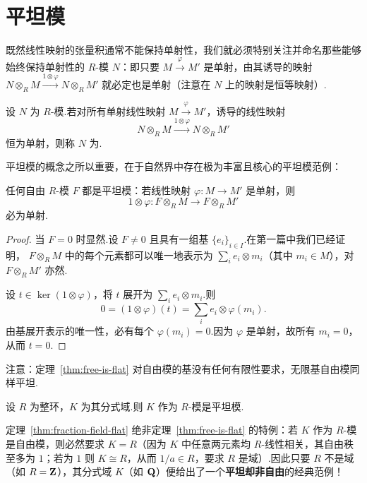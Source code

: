 \section{平坦模}
\label{sec:flat}

既然线性映射的张量积通常不能保持单射性，我们就必须特别关注并命名那些能够始终保持单射性的 $R$-模 $N$：即只要 $M \xrightarrow{\varphi} M'$ 是单射，由其诱导的映射 $N \otimes_R M \xrightarrow{1 \otimes \varphi} N \otimes_R M'$ 就必定也是单射（注意在 $N$ 上的映射是恒等映射）.

\begin{definition}\label{def:flat-module}
设 $N$ 为 $R$-模.若对所有单射线性映射 $M \xrightarrow{\varphi} M'$，诱导的线性映射
\[
  N \otimes_R M \xrightarrow{1 \otimes \varphi} N \otimes_R M'
\]
恒为单射，则称 $N$ 为.
\end{definition}

平坦模的概念之所以重要，在于自然界中存在极为丰富且核心的平坦模范例：

\begin{theorem}[自由模必平坦]\label{thm:free-is-flat}
任何自由 $R$-模 $F$ 都是平坦模：若线性映射 $\varphi \colon M \to M'$ 是单射，则
\[
  1 \otimes \varphi \colon F \otimes_R M \to F \otimes_R M'
\]
必为单射.
\end{theorem}

\begin{proof}
当 $F = 0$ 时显然.设 $F \neq 0$ 且具有一组基 $\{e_i\}_{i \in I}$.在第一篇中我们已经证明， $F \otimes_R M$ 中的每个元素都可以唯一地表示为 $\sum_{i} e_i \otimes m_i$（其中 $m_i \in M$），对 $F \otimes_R M'$ 亦然.

设 $t \in \ker(1 \otimes \varphi)$，将 $t$ 展开为 $\sum_i e_i \otimes m_i$.则
\[
  0 = (1 \otimes \varphi)(t) = \sum_{i} e_i \otimes \varphi(m_i).
\]
由基展开表示的唯一性，必有每个 $\varphi(m_i) = 0$.因为 $\varphi$ 是单射，故所有 $m_i = 0$，从而 $t = 0$.
\end{proof}

注意：定理~\ref{thm:free-is-flat} 对自由模的基没有任何有限性要求，无限基自由模同样平坦.

\begin{theorem}[分式域必平坦]\label{thm:fraction-field-flat}
设 $R$ 为整环，$K$ 为其分式域.则 $K$ 作为 $R$-模是平坦模.
\end{theorem}

\begin{remark}\label{rem:fraction-not-free}
定理~\ref{thm:fraction-field-flat} 绝非定理~\ref{thm:free-is-flat} 的特例：若 $K$ 作为 $R$-模是自由模，则必然要求 $K = R$（因为 $K$ 中任意两元素均 $R$-线性相关，其自由秩至多为 $1$；若为 $1$ 则 $K \cong R$，从而 $1/a \in R$，要求 $R$ 是域）.因此只要 $R$ 不是域（如 $R = \mathbf{Z}$），其分式域 $K$（如 $\mathbf{Q}$）便给出了一个\textbf{平坦却非自由}的经典范例！
\end{remark}

